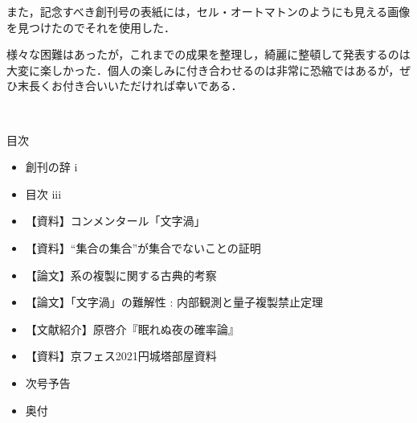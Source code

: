 \documentclass[10pt, a5paper, twoside]{jsarticle}
\theoremstyle{definition}
\begin{document}
	また，記念すべき創刊号の表紙には，セル・オートマトンのようにも見える画像を見つけたのでそれを使用した．

	様々な困難はあったが，これまでの成果を整理し，綺麗に整頓して発表するのは大変に楽しかった．個人の楽しみに付き合わせるのは非常に恐縮ではあるが，ぜひ末長くお付き合いいただければ幸いである．


	\clearpage

	\begin{center}

	{\Large 　}

		\Large{目次}

	\end{center}

	\begin{itemize}
		\item 創刊の辞 \dotfill i

			\vspace{3mm}

		\item 目次 \dotfill iii

			\vspace{3mm}

		\item 【資料】コンメンタール「文字渦」 

			\vspace{3mm}

		\item 【資料】“集合の集合”が集合でないことの証明 

			\vspace{3mm}

		\item 【論文】系の複製に関する古典的考察 

			\vspace{3mm}

		\item 【論文】「文字渦」の難解性 : 内部観測と量子複製禁止定理 

			\vspace{3mm}

		\item 【文献紹介】原啓介『眠れぬ夜の確率論』 

			\vspace{3mm}

		\item 【資料】京フェス2021円城塔部屋資料 

			\vspace{3mm}

		\item 次号予告 

			\vspace{3mm}

		\item 奥付 

	\end{itemize}
\end{document}
